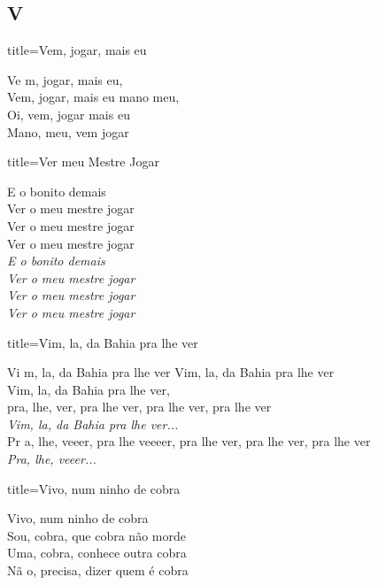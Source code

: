 \documentclass[fontsize=14pt, paper=a4, twoside, DIV=20]{scrreprt} %
\newcommand\chapTOC[1]{
    \chapter*{#1}
    \addcontentsline{toc}{chapter}{#1}
    \markboth{#1}{#1}}
\begin{document}
\begin{multicols*}{2}
\chapTOC{V}

\begin{song}{title={Vem, jogar, mais eu}}
        \begin{verse*}
            Ve m, jogar, mais eu,\\
            Vem, jogar, mais eu mano meu,\\
            Oi, vem, jogar mais eu\\
            Mano, meu, vem jogar\\
        \end{verse*}
\end{song}

\begin{song}{title={Ver meu Mestre Jogar}}
    \begin{verse*}
            E o bonito demais \\
            Ver o meu mestre jogar \\
            Ver o meu mestre jogar \\
            Ver o meu mestre jogar \\


            \textit{E o bonito demais \\
            Ver o meu mestre jogar \\
            Ver o meu mestre jogar \\
            Ver o meu mestre jogar \\ }
    \end{verse*}

\end{song}
\begin{song}{title={Vim, la, da Bahia pra lhe ver}}
        \begin{verse*}
            Vi m, la, da Bahia pra lhe ver
            Vim, la, da Bahia pra lhe ver\\
            Vim, la, da Bahia pra lhe ver,\\
            pra, lhe, ver, pra lhe ver, pra lhe ver, pra lhe ver\\
            \textit{Vim, la, da Bahia pra lhe ver...}\\
            Pr a, lhe, veeer, pra lhe veeeer, pra lhe ver, pra lhe ver, pra lhe ver\\
            \textit{Pra, lhe, veeer...}\\
        \end{verse*}
\end{song}

\begin{song}{title={Vivo, num ninho de cobra}}
        \begin{verse*}
            Vivo, num ninho de cobra \\
            Sou, cobra, que cobra não morde\\
            Uma, cobra, conhece outra cobra\\
            Nã o, precisa, dizer quem é cobra\\
        \end{verse*}
\end{song}


\end{multicols*}
\end{document}
